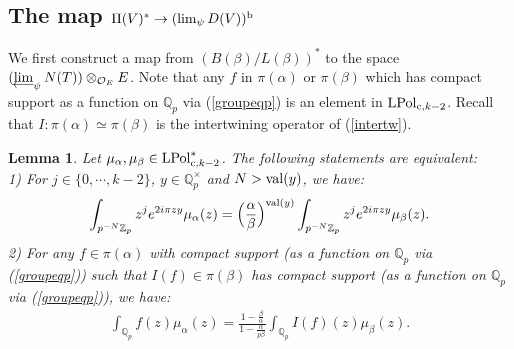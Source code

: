 \documentclass[11pt]{amsart}
\def\limproj{\mathop{\oalign{{\rm lim}\cr 
\hidewidth$\longleftarrow$\hidewidth\cr}}}
\def\Z{{\mathbb Z}_p}
\def\Q{{\mathbb Q}_p}
\def\O{{\mathcal O}_E}
\newtheorem{lem}[definit]{\bf{Lemma}}
\begin{document}
\subsection{The map $\Pi(V)^*\rightarrow (\lim_{\psi}D(V))^{\rm b}$}\label{unsens} 
We first construct a map from $(B(\beta)/L(\beta))^*$ to
the space $(\limproj_{\psi}N(T))\otimes_{\O}E$. Note that any $f$ in
$\pi(\alpha)$ or $\pi(\beta)$ which has compact support as a function
on $\Q$ via (\ref{groupeqp}) is an element in ${\rm LPol}_{{\rm
    c},k-2}$. Recall that $I:\pi(\alpha)\simeq \pi(\beta)$ is the
intertwining operator of (\ref{intertw}).  
 
\begin{lem}\label{crucial2} 
Let $\mu_{\alpha},\mu_{\beta}\in {\rm LPol}_{{\rm c},k-2}^*$. The
following statements are equivalent:\\  
1) For $j\in \{0,\cdots,k-2\}$, $y\in \Q^{\times}$ and $N>{\rm val}(y)$, we have: 
\begin{eqnarray}\label{rajout} 
\int_{p^{-N}\Z}z^je^{2i\pi zy}\mu_{\alpha}(z)
=\Big(\frac{\alpha}{\beta}\Big)^{{\rm val}(y)}\int_{p^{-N}\Z}z^je^{2i\pi zy}\mu_{\beta}(z). 
\end{eqnarray} 
2) For any $f\in \pi(\alpha)$ with compact support (as a function on
   $\Q$ via (\ref{groupeqp})) such that $I(f)\in \pi(\beta)$ has
   compact support (as a function on $\Q$ via (\ref{groupeqp})), we
   have:  
\begin{eqnarray}\label{debutinter} 
\int_{\Q}f(z)\mu_{\alpha}(z)=\frac{1-\frac{\beta}{\alpha}}
{1-\frac{\alpha}{p\beta}}\int_{\Q}I(f)(z)\mu_{\beta}(z).  
\end{eqnarray} 
\end{lem} 
\end{document}
